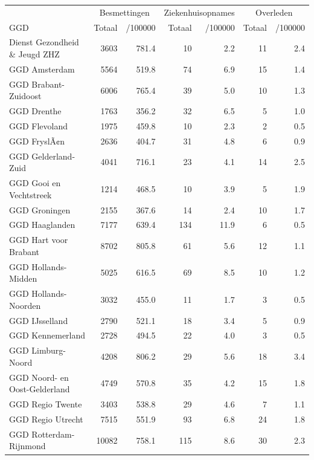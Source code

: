 \documentclass[
  english,
  man,floatsintext]{apa6}
\begin{document}
\begin{table}
\centering\begingroup\fontsize{10}{12}\selectfont

\begin{threeparttable}
\begin{tabular}{lrrrrrr}
\toprule
\multicolumn{1}{c}{ } & \multicolumn{2}{c}{Besmettingen} & \multicolumn{2}{c}{Ziekenhuisopnames} & \multicolumn{2}{c}{Overleden} \\
\cmidrule(l{3pt}r{3pt}){2-3} \cmidrule(l{3pt}r{3pt}){4-5} \cmidrule(l{3pt}r{3pt}){6-7}
GGD & Totaal & /100000 & Totaal & /100000 & Totaal & /100000\\
\midrule
Dienst Gezondheid \& Jeugd ZHZ & 3603 & 781.4 & 10 & 2.2 & 11 & 2.4\\
GGD Amsterdam & 5564 & 519.8 & 74 & 6.9 & 15 & 1.4\\
GGD Brabant-Zuidoost & 6006 & 765.4 & 39 & 5.0 & 10 & 1.3\\
GGD Drenthe & 1763 & 356.2 & 32 & 6.5 & 5 & 1.0\\
GGD Flevoland & 1975 & 459.8 & 10 & 2.3 & 2 & 0.5\\
GGD FryslÃ¢n & 2636 & 404.7 & 31 & 4.8 & 6 & 0.9\\
GGD Gelderland-Zuid & 4041 & 716.1 & 23 & 4.1 & 14 & 2.5\\
GGD Gooi en Vechtstreek & 1214 & 468.5 & 10 & 3.9 & 5 & 1.9\\
GGD Groningen & 2155 & 367.6 & 14 & 2.4 & 10 & 1.7\\
GGD Haaglanden & 7177 & 639.4 & 134 & 11.9 & 6 & 0.5\\
GGD Hart voor Brabant & 8702 & 805.8 & 61 & 5.6 & 12 & 1.1\\
GGD Hollands-Midden & 5025 & 616.5 & 69 & 8.5 & 10 & 1.2\\
GGD Hollands-Noorden & 3032 & 455.0 & 11 & 1.7 & 3 & 0.5\\
GGD IJsselland & 2790 & 521.1 & 18 & 3.4 & 5 & 0.9\\
GGD Kennemerland & 2728 & 494.5 & 22 & 4.0 & 3 & 0.5\\
GGD Limburg-Noord & 4208 & 806.2 & 29 & 5.6 & 18 & 3.4\\
GGD Noord- en Oost-Gelderland & 4749 & 570.8 & 35 & 4.2 & 15 & 1.8\\
GGD Regio Twente & 3403 & 538.8 & 29 & 4.6 & 7 & 1.1\\
GGD Regio Utrecht & 7515 & 551.9 & 93 & 6.8 & 24 & 1.8\\
GGD Rotterdam-Rijnmond & 10082 & 758.1 & 115 & 8.6 & 30 & 2.3\\

\end{tabular}
\end{threeparttable}
\end{table}
\end{document}
